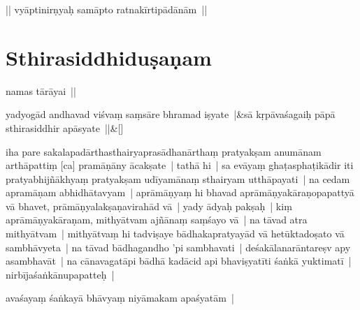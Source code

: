 \documentclass[article,12pt,a4paper]{memoir}%
\newcounter{parCount}
\begin{document}
	  
	  \pstart \leavevmode%
	|| vyāptinirṇyaḥ samāpto ratnakīrtipādānām || 
	{}
	\pend%
      
	    
	    \endnumbering%
	    
	  
	  
	
	    
	    \beginnumbering%
	    
	  
\chapter[{Sthirasiddhiduṣaṇam}][{Sthirasiddhiduṣaṇam}]{Sthirasiddhiduṣaṇam}\label{Sthirasiddhiduṣaṇam}

	  
	  \pstart \leavevmode%
	\label{thakur75-112.3}namas tārāyai ||
	{}
	\pend%
      
	    
	    \stanza[\smallbreak]
	  yadyogād andhavad viśvaṃ saṃsāre bhramad iṣyate |&sā kṛpāvaśagaiḥ pāpā sthirasiddhir apāsyate ||\&[\smallbreak]
	  
	  
	  

	  
	  \pstart \leavevmode%
	\label{thakur75-112.6}iha pare sakalapadārthasthairyaprasādhanārthaṃ pratyakṣam anumānam arthāpattiṃ [ca] pramāṇāny ācakṣate | \label{thakur75-112.7} tathā hi | sa evāyaṃ ghaṭasphaṭikādir iti pratyabhijñākhyaṃ pratyakṣam udīyamānaṃ sthairyam utthāpayati | na cedam apramāṇam abhidhātavyam | aprāmāṇyaṃ hi bhavad aprāmāṇyakāraṇopapattyā vā bhavet, prāmāṇyalakṣaṇavirahād vā | \label{thakur75-112.9} yady ādyaḥ pakṣaḥ | kiṃ aprāmāṇyakāraṇam, mithyātvam ajñānaṃ saṃśayo vā | \label{thakur75-112.10} na tāvad atra mithyātvam | mithyātvaṃ hi tadviṣaye bādhakapratyayād vā hetūktadoṣato vā sambhāvyeta | \label{thakur75-112.11} na tāvad bādhagandho 'pi sambhavati | deśakālanarāntareṣv apy asambhavāt | na cānavagatāpi bādhā kadācid api bhaviṣyatīti śaṅkā yuktimatī | nirbījaśaṅkānupapatteḥ |
	{}
	\pend%
      

	  
	  \pstart \leavevmode%
	avaśayaṃ śaṅkayā bhāvyaṃ niyāmakam apaśyatām | 
	{}
	\pend%
      
\end{document}
